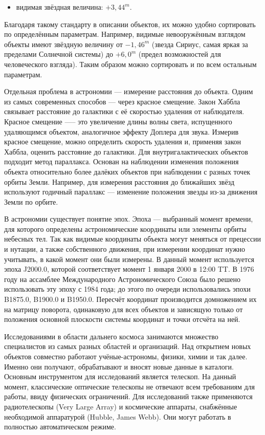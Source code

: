 \documentclass[14pt]{extreport}
\begin{document}
{\begin{itemize}
            \item видимая звёздная величина: $+3,44^m$.
        \end{itemize}

        Благодаря такому стандарту в описании объектов, их можно удобно сортировать по определённым параметрам. Например, видимые невооружённым взглядом объекты имеют звёздную величину от $-1,46^m$ (звезда Сириус, самая яркая за пределами Солнечной системы) до $+6,0^m$ (предел возможностей для человеческого взгляда). Таким образом можно сортировать и по всем остальным параметрам.

        Отдельная проблема в астрономии --- измерение расстояния до объекта. Одним из самых современных способов --- через красное смещение. Закон Хаббла связывает расстояние до галактики с её скоростью удаления от наблюдателя. Красное смещение —-- это увеличение длины волны света, испущенного удаляющимся объектом, аналогичное эффекту Доплера для звука. Измерив красное смещение, можно определить скорость удаления и, применяя закон Хаббла, оценить расстояние до галактики. Для внутригалактических объектов подходит метод параллакса. Основан на наблюдении изменения положения объекта относительно более далёких объектов при наблюдении с разных точек орбиты Земли. Например, для измерения расстояния до ближайших звёзд используют годичный параллакс — изменение положения звезды из-за движения Земли по орбите. 

        В астрономии существует понятие эпох. Эпоха --- выбранный момент времени, для которого определены астрономические координаты или элементы орбиты небесных тел. Так как видимые координаты объекта могут меняться от прецессии и нутации, а также собственного движения, при измерении координат нужно учитывать, в какой момент они были измерены. В данный момент используется эпоха J2000.0, которой соответствует момент 1 января 2000 в 12:00 TT. В 1976 году на ассамблее Международного Астрономического Союза было решено использовать эту эпоху с 1984 года; до этого по очереди использовались эпохи B1875.0, B1900.0 и B1950.0. Пересчёт координат производится домножением их на матрицу поворота, одинаковую для всех объектов и зависящую только от положения основной плоскости системы координат и точки отсчёта на ней.
        
        Исследованиями в области дальнего космоса занимаются множество специалистов из самых разных областей и организаций. Над открытием новых объектов совместно работают учёные-астрономы, физики, химии и так далее. Именно они получают, обрабатывают и вносят новые данные в каталоги. Основным инструментом для исследований является телескоп. На данный момент, классические оптические телескопы не отвечают всем требованиям для работы, ввиду физических ограничений. Для исследований также применяются радиотелескопы (Very Large Array) и космические аппараты, снабжённые необходимой аппаратурой (Hubble, James Webb). Они могут работать в полностью автоматическом режиме.

}
\end{document}
